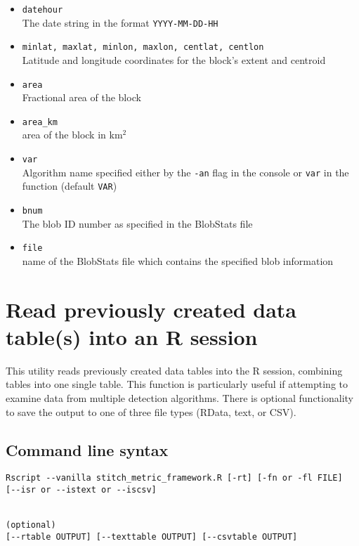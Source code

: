 \documentclass{article}
\begin{document}
\begin{itemize}
\item[]\texttt{datehour}\\The date string in the format \texttt{YYYY-MM-DD-HH}
\item[] \texttt{minlat, maxlat, minlon, maxlon, centlat, centlon}\\ Latitude and longitude coordinates for the block's extent and centroid
\item[] \texttt{area}\\ Fractional area of the block
\item[] \texttt{area\_km}\\area of the block in km$^2$
\item[] \texttt{var}\\ Algorithm name specified either by the \texttt{-an} flag in the console or \texttt{var} in the function (default \texttt{VAR})
\item[] \texttt{bnum} \\The blob ID number as specified in the BlobStats file
\item[] \texttt{file} \\name of the BlobStats file which contains the specified blob information
\end{itemize}



\section{Read previously created data table(s) into an R session}\label{combinetable}
This utility reads previously created data tables into the R session, combining tables into one single table. This function is particularly useful if attempting to examine data from multiple detection algorithms. There is optional functionality to save the output to one of three file types (RData, text, or CSV).
\subsection{Command line syntax}
\begin{verbatim}
Rscript --vanilla stitch_metric_framework.R [-rt] [-fn or -fl FILE] 
[--isr or --istext or --iscsv]


(optional)
[--rtable OUTPUT] [--texttable OUTPUT] [--csvtable OUTPUT]
\end{verbatim}
\end{document}
